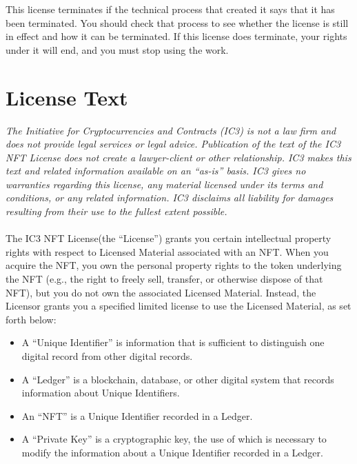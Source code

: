 \documentclass{article}
\newcommand{\iccclicense}{IC3 NFT License\xspace}
\newcommand{\sect}[1]{\vspace{12pt}\noindent{\strong{#1}}}
\newcommand{\subsect}[1]{\vspace{12pt}\noindent{\em{#1}}}
\begin{document}
This license terminates if the technical process that created it says that it has been terminated. You should check that process to see whether the license is still in effect and how it can be terminated. If this license does terminate, your rights under it will end, and you must stop using the work.


\section{License Text}
\label{sec:text}

\begin{sffamily} 
 
\emph{The Initiative for Cryptocurrencies and Contracts (IC3) is not a law firm and does not provide legal services or legal advice. Publication of the text of the \iccclicense does not create a lawyer-client or other relationship. IC3 makes this text and related information available on an ``as-is'' basis. IC3 gives no warranties regarding this license, any material licensed under its terms and conditions, or any related information. IC3 disclaims all liability for damages resulting from their use to the fullest extent possible.}\\\\
The \iccclicense (the ``License'') grants you certain intellectual property rights with respect to Licensed Material associated with an NFT. When you acquire the NFT, you own the personal property rights to the token underlying the NFT (e.g., the right to freely sell, transfer, or otherwise dispose of that  NFT), but you do not own the associated Licensed Material. Instead, the Licensor grants you a specified limited license to use the Licensed Material, as set forth below:

\sect{Definitions}

\subsect{Ledgers and NFTs}


	\begin{itemize}
	\item	A ``Unique Identifier'' is information that is sufficient to distinguish one digital record from other digital records.
		
	\item	A ``Ledger'' is a blockchain, database, or other digital system that records information about Unique Identifiers.
		
	\item	An ``NFT'' is a Unique Identifier recorded in a Ledger.
		
	\item	A ``Private Key'' is a cryptographic key, the use of which is necessary to modify the information about a Unique Identifier recorded in a Ledger.
		

\end{itemize}
\end{sffamily}
\end{document}
